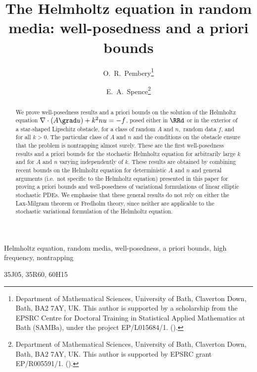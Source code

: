 \documentclass[final]{siamonline171218}
\title{The Helmholtz equation in random media: well-posedness and a priori bounds}%
\author{O.~R.~Pembery\thanks{Department of Mathematical Sciences, University of Bath, Claverton Down, Bath, BA2 7AY, UK. This author is supported by a scholarship from the EPSRC Centre for Doctoral Training in Statistical Applied Mathematics at Bath (SAMBa), under the project EP/L015684/1. (\email{O.R.Pembery@bath.ac.uk}).}
\and E.~A.~Spence\thanks{Department of Mathematical Sciences, University of Bath, Claverton Down, Bath, BA2 7AY, UK. This author is supported by EPSRC grant EP/R005591/1. (\email{E.A.Spence@bath.ac.uk}).}}
\begin{document}
\maketitle



\begin{abstract}
We prove well-posedness results and a priori bounds on the solution of the Helmholtz equation $\nabla\cdot(A\grad u) + k^2 n u = -f$, posed either in $\RRd$ or in the exterior of a star-shaped Lipschitz obstacle, for a class of random $A$ and $n,$ random data $f$, and for all $k>0$. The particular class of $A$ and $n$ and the conditions on the obstacle ensure that the problem is nontrapping almost surely. These are the first well-posedness results and a priori bounds for the stochastic Helmholtz equation for arbitrarily large $k$ and for $A$ and $n$ varying independently of $k$. These results are obtained by combining recent bounds on the Helmholtz equation for deterministic $A$ and $n$ and general arguments (i.e.~not specific to the Helmholtz equation) presented in this paper for proving a priori bounds and well-posedness of variational formulations of linear elliptic stochastic PDEs. We emphasise that these general results do not rely on either the Lax-Milgram theorem or Fredholm theory, since neither are applicable to the stochastic variational formulation of the Helmholtz equation.
\end{abstract}

\begin{keywords}
Helmholtz equation, random media, well-posedness, a priori bounds, high frequency, nontrapping
\end{keywords}

\begin{AMS}
35J05, 35R60, 60H15
\end{AMS}


 









\appendix

 	










\end{document}
